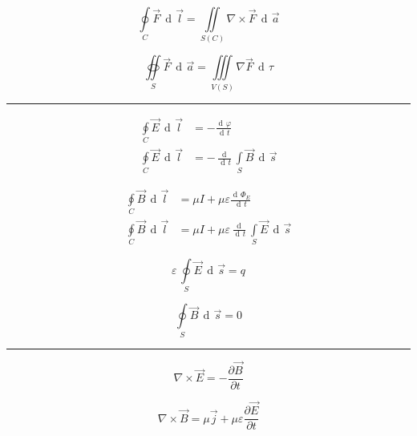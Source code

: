 \documentclass[12pt]{article}
\DeclareMathOperator{\der}{\operatorname{d}\!}
\newcommand{\grayrule}{{\color{lightgray} \hrule}}
\begin{document}
\begin{multicols}{3}
\begin{equation*}
    \oint\limits_C \Vec{F}\,\der \Vec{l}
        = \iint\limits_{S(C)} \nabla \times \Vec{F}\,\der\Vec{a} 
\end{equation*}

\begin{equation*}
    \oiint\limits_S \Vec{F} \, \der \Vec{a} = \iiint\limits_{V(S)} \nabla \Vec{F} \, \der\tau
\end{equation*}

\grayrule

\begin{equation*}
    \begin{split}
        \oint\limits_C \Vec{E} \, \der\Vec{l} &= - \frac{\der\varphi}{\der t}\\
        \oint\limits_C \Vec{E} \, \der\Vec{l}
            &= - \frac{\der}{\der t} \int\limits_S \Vec{B} \, \der\Vec{s}
    \end{split}
\end{equation*}

\begin{equation*}
    \begin{split}
        \oint\limits_C \Vec{B} \, \der\Vec{l}
            &= \mu I + \mu \varepsilon \frac{\der\Phi_E}{\der t}\\
        \oint\limits_C \Vec{B} \, \der\Vec{l}
            &= \mu I + \mu \varepsilon \frac{\der}{\der t} \int\limits_S \Vec{E} \, \der\Vec{s}
    \end{split}
\end{equation*}

\begin{equation*}
    \varepsilon \, \oint\limits_S \Vec{E} \, \der\Vec{s} = q
\end{equation*}

\begin{equation*}
    \oint\limits_S \Vec{B} \, \der\Vec{s} = 0
\end{equation*}

\grayrule

\begin{equation*}
    \nabla \times \Vec{E} = - \frac{\partial \Vec{B}}{\partial t}
\end{equation*}

\begin{equation*}
    \nabla \times \Vec{B} = \mu \Vec{j} + \mu \varepsilon \frac{\partial \Vec{E}}{\partial t}
\end{equation*}


\end{multicols}
\end{document}
